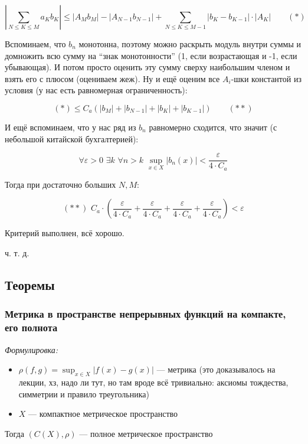 \documentclass{article}
\def\dbl{\,\,}
\begin{document}
\[
    \left|\sum_{N \le K \le M} {a_K b_K}\right| \le |A_Mb_M| - |A_{N - 1}b_{N - 1}| + \sum_{N \le K \le M - 1} {\left|b_K - b_{K - 1}\right| \cdot \left|A_K\right|} \qquad (*)
\]

Вспоминаем, что $b_n$ монотонна, поэтому можно раскрыть модуль внутри суммы и домножить всю сумму на ``знак монотонности'' (1, если возрастающая и -1, если убывающая). И потом просто оценить эту сумму сверху наибольшим членом и взять его с плюсом (оцениваем жеж). Ну и ещё оценим все $A_i$-шки константой из условия (у нас есть равномерная ограниченность):

\[
    (*) \le C_a \left( |b_M| + |b_{N - 1}| + |b_{K}| + |b_{K - 1}|\right) \qquad (**)    
\]

И ещё вспоминаем, что у нас ряд из $b_n$ равномерно сходится, что значит (с небольшой китайской бухгалтерией): 

\[ \forall \varepsilon > 0 \dbl \exists k \dbl \forall n > k \dbl \sup_{x \in X} |b_n(x)| < \frac{\varepsilon}{4 \cdot C_a} \]

Тогда при достаточно больших $N, M$:

\[(**) \dbl C_a \cdot \left(\frac{\varepsilon}{4 \cdot C_a} + \frac{\varepsilon}{4 \cdot C_a} + \frac{\varepsilon}{4 \cdot C_a} + \frac{\varepsilon}{4 \cdot C_a} \right) < \varepsilon\]

Критерий выполнен, всё хорошо.

ч. т. д.

\newpage

\subsection{Теоремы}

\subsubsection{Метрика в пространстве непрерывных функций на компакте, его полнота}
\textit{Формулировка:}

\begin{itemize}
    \item $\rho(f, g) = \sup_{x \in X} |f(x) - g(x)|$ --- метрика (это доказывалось на лекции, хз, надо ли тут, но там вроде всё тривиально: аксиомы тождества, симметрии и правило треугольника) 
    \item $X$ --- компактное метрическое пространство
\end{itemize}

Тогда $\left(C(X), \rho \right)$ --- полное метрическое пространство
\end{document}
